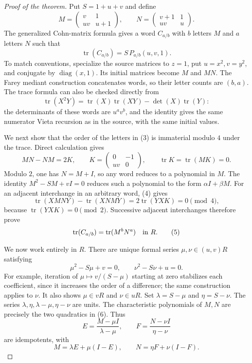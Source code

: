 \documentclass[11pt]{article}
\newcommand{\tr}{\operatorname{tr}}
\begin{document}
\begin{proof}[Proof of the theorem]
Put $S=1+u+v$ and define
\[
 M=\begin{pmatrix}v&1\\uv&u+1\end{pmatrix},
 \qquad
 N=\begin{pmatrix}v+1&1\\uv&u\end{pmatrix}.
 \tag{2}
\]
The generalized Cohn-matrix formula
\cite[Theorem 10.1]{EVW} gives a word $C_{a/b}$ with $b$ letters
$M$ and $a$ letters $N$ such that
\[
 \tr(C_{a/b})=S\,P_{a/b}(u,v,1).
 \tag{3}
\]
To match conventions, specialize the source matrices to $z=1$,
put $u=x^2,v=y^2$, and conjugate by $\operatorname{diag}(x,1)$.
Its initial matrices become $M$ and $MN$.
The Farey mediant construction concatenates words, so their letter
counts are $(b,a)$.
The trace formula can also be checked directly from
\[
 \tr(X^2Y)=\tr(X)\tr(XY)-\det(X)\tr(Y):
\]
the determinants of these words are $u^av^b$, and the identity gives
the same numerator Vieta recursion as in the source, with the
same initial values.

We next show that the order of the letters in (3) is immaterial
modulo $4$ under the trace. Direct calculation gives
\[
 MN-NM=2K,\qquad
 K=\begin{pmatrix}0&-1\\uv&0\end{pmatrix},
 \qquad \tr K=\tr(MK)=0.
 \tag{4}
\]
Modulo $2$, one has $N=M+I$, so any word reduces to a polynomial
in $M$. The identity $M^2-SM+vI=0$ reduces such a polynomial to
the form $\alpha I+\beta M$.
For an adjacent interchange in an arbitrary word, (4) gives
\[
 \tr(XMNY)-\tr(XNMY)=2\tr(YXK)=0\pmod4,
\]
because $\tr(YXK)=0\pmod2$.
Successive adjacent interchanges therefore prove
\[
 \tr(C_{a/b})=\tr(M^bN^a)\quad\hbox{in }R.
 \tag{5}
\]

We now work entirely in $R$. There are unique formal series
$\mu,\nu\in(u,v)R$ satisfying
\[
 \mu^2-S\mu+v=0,\qquad
 \nu^2-S\nu+u=0.
 \tag{6}
\]
For example, iteration of $\mu\mapsto v/(S-\mu)$ starting at zero
stabilizes each coefficient, since it increases the order of a
difference; the same construction applies to $\nu$.
It also shows $\mu\in vR$ and $\nu\in uR$.
Set $\lambda=S-\mu$ and $\eta=S-\nu$.
The series $\lambda,\eta,\lambda-\mu,\eta-\nu$ are units.
The characteristic polynomials of $M,N$ are precisely the two
quadratics in (6). Thus
\[
 E=\frac{M-\mu I}{\lambda-\mu},\qquad
 F=\frac{N-\nu I}{\eta-\nu}
 \tag{7}
\]
are idempotents, with
\[
 M=\lambda E+\mu(I-E),\qquad
 N=\eta F+\nu(I-F).
 \tag{8}
\]


\end{proof}
\end{document}
